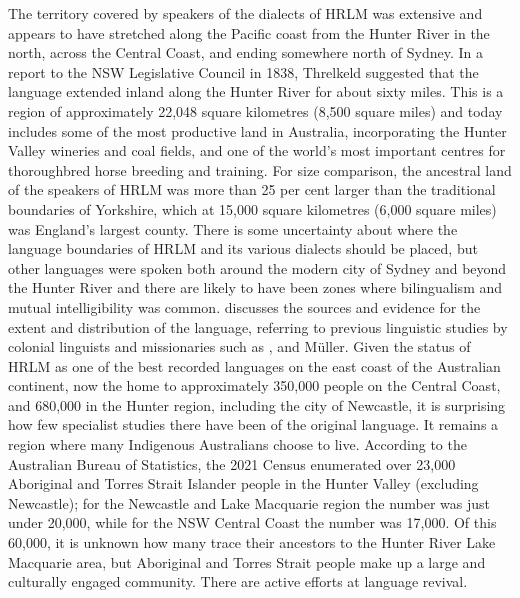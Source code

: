 {The territory covered by speakers of the dialects of HRLM was extensive and appears to have stretched along the Pacific coast from the Hunter River in the north, across the Central Coast, and ending somewhere north of Sydney. In a report to the NSW Legislative Council in 1838, Threlkeld suggested that the language extended inland along the Hunter River for about sixty miles. This is a region of approximately 22,048 square kilometres (8,500 square miles) and today includes some of the most productive land in Australia, incorporating the Hunter Valley wineries and coal fields, and one of the world’s most important centres for thoroughbred horse breeding and training. For size comparison, the ancestral land of the speakers of HRLM was more than 25 per cent larger than the traditional boundaries of Yorkshire, which at 15,000 square kilometres (6,000 square miles) was England’s largest county. There is some uncertainty about where the language boundaries of HRLM and its various dialects should be placed, but other languages were spoken both around the modern city of Sydney and beyond the Hunter River and there are likely to have been zones where bilingualism and mutual intelligibility was common. \citet[12--14]{lissarrague_salvage_2006} discusses the sources and evidence for the extent and distribution of the language, referring to previous linguistic studies by colonial linguists and missionaries such as \citet{hale_languages_1846}, \citet{fraser_australian_1892} and Müller. Given the status of HRLM as one of the best recorded languages on the east coast of the Australian continent, now the home to approximately 350,000 people on the Central Coast, and 680,000 in the Hunter region, including the city of Newcastle, it is surprising how few specialist studies there have been of the original language. It remains a region where many Indigenous Australians choose to live. According to the Australian Bureau of Statistics, the 2021 Census enumerated over 23,000 Aboriginal and Torres Strait Islander people in the Hunter Valley (excluding Newcastle); for the Newcastle and Lake Macquarie region the number was just under 20,000, while for the NSW Central Coast the number was 17,000. Of this 60,000, it is unknown how many trace their ancestors to the Hunter River Lake Macquarie area, but Aboriginal and Torres Strait people make up a large and culturally engaged community. There are active efforts at language revival.

}
